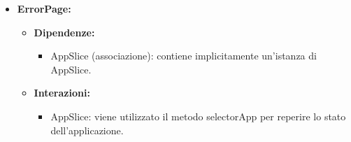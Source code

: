 \begin{itemize}
      \item \textbf{ErrorPage:}
            \begin{itemize}
                  \item \textbf{Dipendenze:}
                        \begin{itemize}
                              \item AppSlice (associazione): contiene implicitamente un'istanza di AppSlice.
                        \end{itemize}
                  \item \textbf{Interazioni:}
                        \begin{itemize}
                              \item AppSlice: viene utilizzato il metodo selectorApp per reperire lo stato
                                    dell'applicazione.
                        \end{itemize}
            \end{itemize}
\end{itemize}

